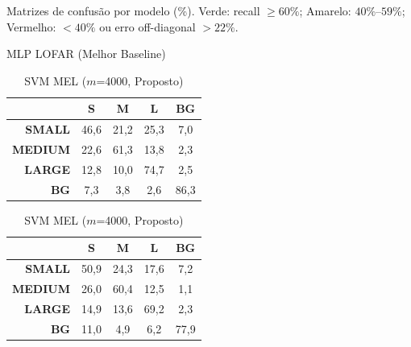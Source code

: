 \documentclass[a4paper,12pt]{article}
\begin{document}
\begin{table}[ht]
\centering
\caption{Matrizes de confusão por modelo (\%). Verde: recall $\geq 60\%$; Amarelo: $40\%$--$59\%$; Vermelho: $< 40\%$ ou erro off-diagonal $> 22\%$.}
\label{tab:confusao}
\begin{subtable}[t]{0.48\linewidth}
\centering
\caption{MLP LOFAR (Melhor Baseline)}
\begin{tabular}{r|cccc}
       & \textbf{S} & \textbf{M} & \textbf{L} & \textbf{BG} \\ \hline
\textbf{SMALL}  & \cellcolor{hiyellow}46,6 & 21,2 & \cellcolor{hired}25,3 & 7,0 \\
\textbf{MEDIUM} & \cellcolor{hired}22,6 & \cellcolor{higreen}61,3 & 13,8 & 2,3 \\
\textbf{LARGE}  & 12,8 & 10,0 & \cellcolor{higreen}74,7 & 2,5 \\
\textbf{BG}     & 7,3 & 3,8 & 2,6 & \cellcolor{higreen}86,3 \\
\end{tabular}
\end{subtable}
\hfill
\begin{subtable}[t]{0.48\linewidth}
\centering
\caption{SVM MEL ($m$=4000, Proposto)}
\begin{tabular}{r|cccc}
       & \textbf{S} & \textbf{M} & \textbf{L} & \textbf{BG} \\ \hline
\textbf{SMALL}  & \cellcolor{hiyellow}50,9 & \cellcolor{hired}24,3 & 17,6 & 7,2 \\
\textbf{MEDIUM} & \cellcolor{hired}26,0 & \cellcolor{higreen}60,4 & 12,5 & 1,1 \\
\textbf{LARGE}  & 14,9 & 13,6 & \cellcolor{higreen}69,2 & 2,3 \\
\textbf{BG}     & 11,0 & 4,9 & 6,2 & \cellcolor{higreen}77,9 \\
\end{tabular}
\end{subtable}


\end{table}
\end{document}
